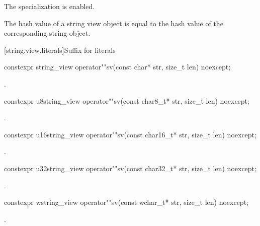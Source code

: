 \begin{itemdescr}
\pnum
The specialization is enabled.
\begin{note}
The hash value of a string view object is equal to the hash value of
the corresponding string object.
\end{note}
\end{itemdescr}

[string.view.literals]{Suffix for  literals}

%
\begin{itemdecl}
constexpr string_view operator""sv(const char* str, size_t len) noexcept;
\end{itemdecl}

\begin{itemdescr}
\pnum
\returns
{}.
\end{itemdescr}

%
\begin{itemdecl}
constexpr u8string_view operator""sv(const char8_t* str, size_t len) noexcept;
\end{itemdecl}
\begin{itemdescr}
\pnum
\returns
{}.
\end{itemdescr}

%
\begin{itemdecl}
constexpr u16string_view operator""sv(const char16_t* str, size_t len) noexcept;
\end{itemdecl}
\begin{itemdescr}
\pnum
\returns
{}.
\end{itemdescr}

%
\begin{itemdecl}
constexpr u32string_view operator""sv(const char32_t* str, size_t len) noexcept;
\end{itemdecl}
\begin{itemdescr}
\pnum
\returns
{}.
\end{itemdescr}

%
\begin{itemdecl}
constexpr wstring_view operator""sv(const wchar_t* str, size_t len) noexcept;
\end{itemdecl}
\begin{itemdescr}
\pnum
\returns
{}.
\end{itemdescr}


